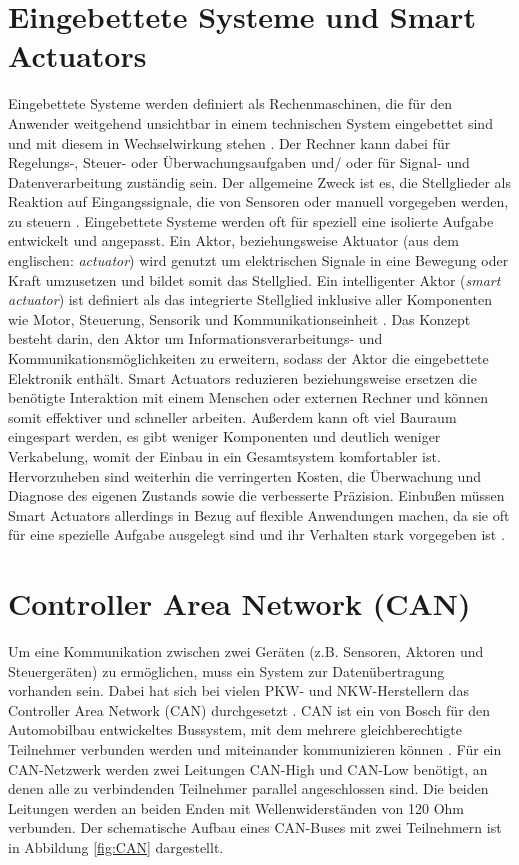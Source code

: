 \section{Eingebettete Systeme und Smart Actuators}
Eingebettete Systeme werden definiert als Rechenmaschinen, die für den Anwender weitgehend unsichtbar in einem technischen System eingebettet sind und mit diesem in Wechselwirkung stehen \cite[S.8]{Gessler2014}. Der Rechner kann dabei für Regelungs-, Steuer- oder Überwachungsaufgaben und/ oder für Signal- und Datenverarbeitung zuständig sein. Der allgemeine Zweck ist es, die Stellglieder als Reaktion auf Eingangssignale, die von Sensoren oder manuell vorgegeben werden, zu steuern \cite[S.1]{Broy2003}. Eingebettete Systeme werden oft für speziell eine isolierte Aufgabe entwickelt und angepasst.
Ein Aktor, beziehungsweise Aktuator (aus dem englischen: \textit{actuator}) wird genutzt um elektrischen Signale in eine Bewegung oder Kraft umzusetzen und bildet somit das Stellglied. 
Ein intelligenter Aktor (\textit{smart actuator}) ist definiert als das integrierte Stellglied inklusive aller Komponenten wie Motor, Steuerung, Sensorik und Kommunikationseinheit \cite[S.442]{smartactuator}.
Das Konzept besteht darin, den Aktor um Informationsverarbeitungs- und Kommunikationsmöglichkeiten zu erweitern, sodass der Aktor die eingebettete Elektronik enthält.
Smart Actuators reduzieren beziehungsweise ersetzen die benötigte Interaktion mit einem Menschen oder externen Rechner und können somit effektiver und schneller arbeiten. Außerdem kann oft viel Bauraum eingespart werden, es gibt weniger Komponenten und deutlich weniger Verkabelung, womit der Einbau in ein Gesamtsystem komfortabler ist. Hervorzuheben sind weiterhin die verringerten Kosten, die Überwachung und Diagnose des eigenen Zustands sowie die verbesserte Präzision. Einbußen müssen Smart Actuators allerdings in Bezug auf flexible Anwendungen machen, da sie oft für eine spezielle Aufgabe ausgelegt sind und ihr Verhalten stark vorgegeben ist \cite[S.4]{smartaktor}.


\section{Controller Area Network (CAN)}
Um eine Kommunikation zwischen zwei Geräten (z.B. Sensoren, Aktoren und Steuergeräten) zu ermöglichen, muss ein System zur Datenübertragung vorhanden sein. Dabei hat sich bei vielen PKW- und NKW-Herstellern  das Controller Area Network (CAN) durchgesetzt \cite[S.57]{Werner2014}. CAN ist ein von Bosch für den Automobilbau entwickeltes Bussystem, mit dem mehrere gleichberechtigte Teilnehmer verbunden werden und miteinander kommunizieren können \cite[S. 278]{Woern2006}.
Für ein CAN-Netzwerk werden zwei Leitungen CAN-High und CAN-Low benötigt, an denen alle zu verbindenden Teilnehmer parallel angeschlossen sind. Die beiden Leitungen werden an beiden Enden mit Wellenwiderständen von 120 Ohm verbunden. Der schematische Aufbau eines CAN-Buses mit zwei Teilnehmern ist in Abbildung \ref{fig:CAN} dargestellt. 

